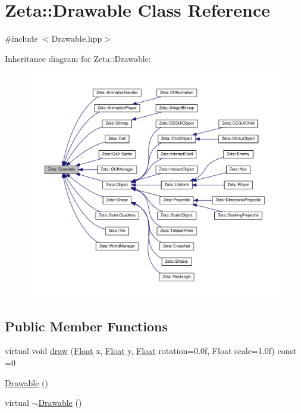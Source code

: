 \hypertarget{classZeta_1_1Drawable}{\section{Zeta\+:\+:Drawable Class Reference}
\label{classZeta_1_1Drawable}
}


{\ttfamily \#include $<$Drawable.\+hpp$>$}



Inheritance diagram for Zeta\+:\+:Drawable\+:\nopagebreak
\begin{figure}[H]
\begin{center}
\leavevmode
\includegraphics[width=350pt]{classZeta_1_1Drawable__inherit__graph}
\end{center}
\end{figure}
\subsection*{Public Member Functions}
\begin{DoxyCompactItemize}
\item 
virtual void \hyperlink{classZeta_1_1Drawable_a3f453a7a971b7eeba1768be3eaedc192}{draw} (\hyperlink{namespaceZeta_a1e0a1265f9b3bd3075fb0fabd39088ba}{Float} x, \hyperlink{namespaceZeta_a1e0a1265f9b3bd3075fb0fabd39088ba}{Float} y, \hyperlink{namespaceZeta_a1e0a1265f9b3bd3075fb0fabd39088ba}{Float} rotation=0.\+0f, Float scale=1.\+0f) const =0
\item 
\hyperlink{classZeta_1_1Drawable_aaa7960918ffa769dd0dd2c37e9a17574}{Drawable} ()
\item 
virtual \hyperlink{classZeta_1_1Drawable_af9738b49ccdedab8591f0652ff559270}{$\sim$\+Drawable} ()
\end{DoxyCompactItemize}


